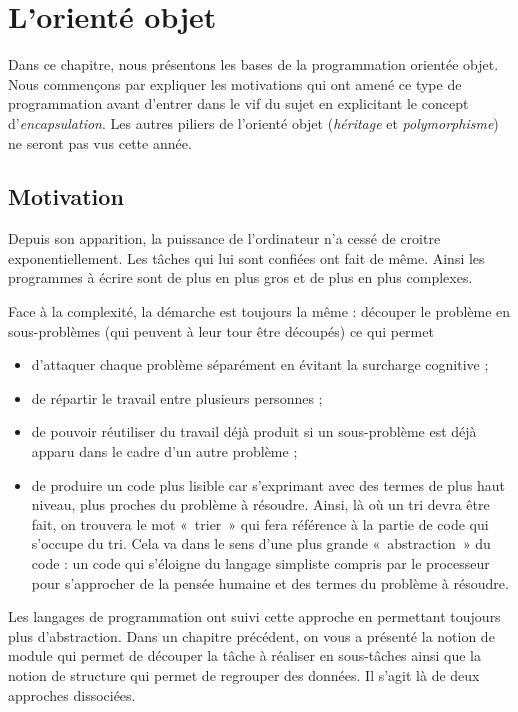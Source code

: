 \chapter{L'orienté objet}


		Dans ce chapitre, nous présentons les bases de la programmation orientée
		objet. Nous commençons par expliquer les motivations qui ont amené ce
		type de programmation avant d'entrer dans le vif du
		sujet en explicitant le concept
		d'\textit{encapsulation}. Les autres piliers de
		l'orienté objet (\textit{héritage} et
		\textit{polymorphisme}) ne seront pas vus cette année.


\section{Motivation}

	Depuis son apparition, la puissance de l'ordinateur
	n'a cessé de croitre exponentiellement. Les tâches qui
	lui sont confiées ont fait de même. Ainsi les programmes à écrire sont
	de plus en plus gros et de plus en plus complexes.
	
	Face à la complexité, la démarche est toujours la même : découper le
	problème en sous-problèmes (qui peuvent à leur tour être découpés) ce
	qui permet

	\liststyleListv
	\begin{itemize}
		\item 
			d'attaquer chaque problème séparément en évitant la
			surcharge cognitive ;
		\item 
			de répartir le travail entre plusieurs personnes ;
		\item 
			de pouvoir réutiliser du travail déjà produit si un sous-problème est
			déjà apparu dans le cadre d'un autre problème ;
		\item 
				de produire un code plus lisible car s'exprimant avec
				des termes de plus haut niveau, plus proches du problème à résoudre.
				Ainsi, là où un tri devra être fait, on trouvera le mot «~trier~» qui
				fera référence à la partie de code qui s’occupe du tri. Cela va dans le
				sens d’une plus grande «~abstraction~» du code : un code qui s’éloigne
				du langage simpliste compris par le processeur pour s’approcher de la
				pensée humaine et des termes du problème à résoudre.
	\end{itemize}
	
	Les langages de programmation ont suivi cette approche en permettant
	toujours plus d’abstraction. Dans un chapitre précédent, on vous a
	présenté la notion de module qui permet de découper la tâche à réaliser
	en sous-tâches ainsi que la notion de structure qui permet de regrouper
	des données. Il s'agit là de deux approches	dissociées. 

